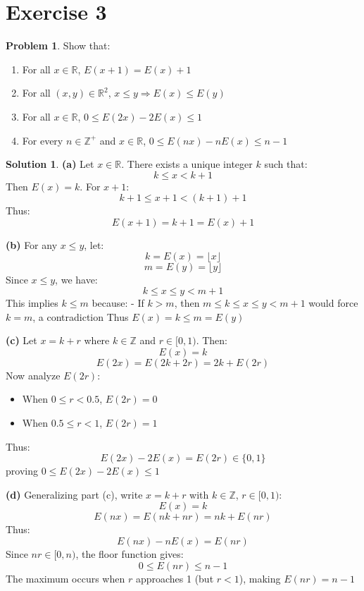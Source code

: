 \documentclass{article}
\theoremstyle{definition}
\newtheorem{problem}{Problem}
\newtheorem*{solution}{Solution}
\begin{document}
\section*{Exercise 3}

\begin{problem}
Show that:
\begin{enumerate}[label=(\alph*)]
    \item For all \( x \in \mathbb{R} \), \( E(x + 1) = E(x) + 1 \)
    \item For all \( (x, y) \in \mathbb{R}^2 \), \( x \leq y \Rightarrow E(x) \leq E(y) \)
    \item For all \( x \in \mathbb{R} \), \( 0 \leq E(2x) - 2E(x) \leq 1 \)
    \item For every \( n \in \mathbb{Z}^+ \) and \( x \in \mathbb{R} \), \( 0 \leq E(nx) - nE(x) \leq n - 1 \)
\end{enumerate}
\end{problem}

\begin{solution}
\textbf{(a)} Let \( x \in \mathbb{R} \). There exists a unique integer \( k \) such that:
\[ k \leq x < k + 1 \]
Then \( E(x) = k \). For \( x + 1 \):
\[ k + 1 \leq x + 1 < (k + 1) + 1 \]
Thus:
\[ E(x + 1) = k + 1 = E(x) + 1 \]

\textbf{(b)} For any \( x \leq y \), let:
\[ k = E(x) = \lfloor x \rfloor \]
\[ m = E(y) = \lfloor y \rfloor \]
Since \( x \leq y \), we have:
\[ k \leq x \leq y < m + 1 \]
This implies \( k \leq m \) because:
- If \( k > m \), then \( m \leq k \leq x \leq y < m + 1 \) would force \( k = m \), a contradiction
Thus \( E(x) = k \leq m = E(y) \)

\textbf{(c)} Let \( x = k + r \) where \( k \in \mathbb{Z} \) and \( r \in [0,1) \). Then:
\[ E(x) = k \]
\[ E(2x) = E(2k + 2r) = 2k + E(2r) \]
Now analyze \( E(2r) \):
\begin{itemize}
\item When \( 0 \leq r < 0.5 \), \( E(2r) = 0 \)
\item When \( 0.5 \leq r < 1 \), \( E(2r) = 1 \)
\end{itemize}
Thus:
\[ E(2x) - 2E(x) = E(2r) \in \{0,1\} \]
proving \( 0 \leq E(2x) - 2E(x) \leq 1 \)

\textbf{(d)} Generalizing part (c), write \( x = k + r \) with \( k \in \mathbb{Z} \), \( r \in [0,1) \):
\[ E(x) = k \]
\[ E(nx) = E(nk + nr) = nk + E(nr) \]
Thus:
\[ E(nx) - nE(x) = E(nr) \]
Since \( nr \in [0,n) \), the floor function gives:
\[ 0 \leq E(nr) \leq n - 1 \]
The maximum occurs when \( r \) approaches 1 (but \( r < 1 \)), making \( E(nr) = n - 1 \)
\end{solution}
\end{document}
